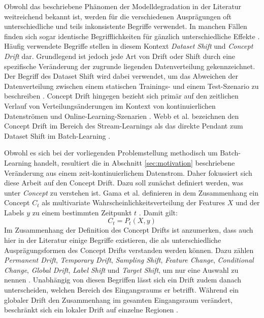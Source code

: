 Obwohl das beschriebene Phänomen der Modelldegradation in der Literatur weitreichend bekannt ist, werden für die verschiedenen Ausprägungen oft unterschiedliche und teils inkonsistente Begriffe verwendet. In manchen Fällen finden sich sogar identische Begrifflichkeiten für gänzlich unterschiedliche Effekte \cite{bayram.2022}. Häufig verwendete Begriffe stellen in diesem Kontext \emph{Dataset Shift} und \emph{Concept Drift} dar. Grundlegend ist jedoch jede Art von Drift oder Shift durch eine spezifische Veränderung der zugrunde liegenden Datenverteilung gekennzeichnet. Der Begriff des Dataset Shift wird dabei verwendet, um das Abweichen der Datenverteilung zwischen einem statischen Trainings- und einem Test-Szenario zu beschreiben \cite{quinonero.2008}. Concept Drift hingegen bezieht sich primär auf den zeitlichen Verlauf von Verteilungsänderungen im Kontext von kontinuierlichen Datenströmen und Online-Learning-Szenarien \cite{gama.2014}. Webb et al. bezeichnen den Concept Drift im Bereich des Stream-Learnings als das direkte Pendant zum Dataset Shift im Batch-Learning \cite{webb.2016}. \par
Obwohl es sich bei der vorliegenden Problemstellung methodisch um Batch-Learning handelt, resultiert die in Abschnitt \ref{sec:motivation} beschriebene Veränderung aus einem zeit-kontinuierlichem Datenstrom. Daher fokussiert sich diese Arbeit auf den Concept Drift. Dazu soll zunächst definiert werden, was unter \emph{Concept} zu verstehen ist. Gama et al. definieren in dem Zusammenhang ein Concept $C_t$ als multivariate Wahrscheinlichkeitsverteilung der Features $X$ und der Labels $y$ zu einem bestimmten Zeitpunkt $t$ \cite{gama.2014, webb.2016}. Damit gilt:
%
\begin{equation} \label{eq:concept}
    C_t = P_t(X, y)
\end{equation}
%
Im Zusammenhang der Definition des Concept Drifts ist anzumerken, dass auch hier in der Literatur einige Begriffe existieren, die als unterschiedliche Ausprägungsformen des Concept Drifts verstanden werden können. Dazu zählen \emph{Permanent Drift}, \emph{Temporary Drift}, \emph{Sampling Shift}, \emph{Feature Change}, \emph{Conditional Change}, \emph{Global Drift}, \emph{Label Shift} und \emph{Target Shift}, um nur eine Auswahl zu nennen \cite{bayram.2022}. 
Unabhängig von diesen Begriffen lässt sich ein Drift zudem danach unterscheiden, welchen Bereich des Eingangsraums er betrifft. Während ein globaler Drift den Zusammenhang im gesamten Eingangsraum verändert, beschränkt sich ein lokaler Drift auf einzelne Regionen \cite{gama.2014}.
